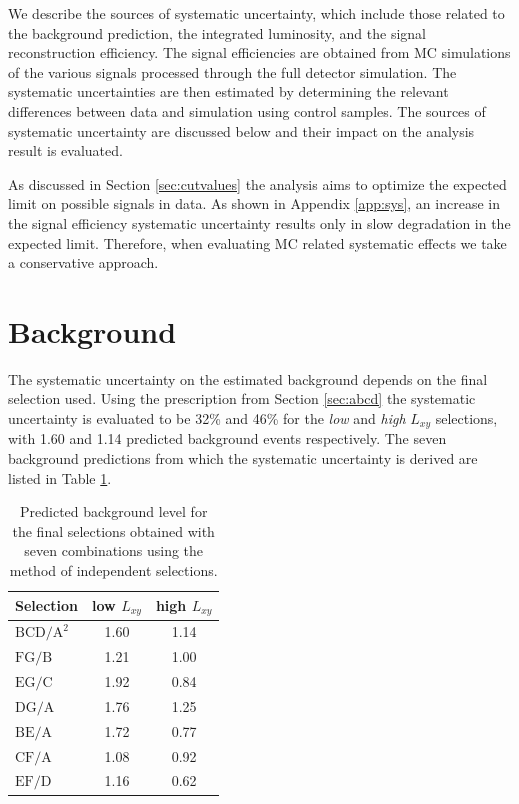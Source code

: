 We describe the sources of systematic uncertainty, which include those related to 
the background prediction, the integrated luminosity, and the signal reconstruction efficiency. 
The signal efficiencies are obtained from MC simulations of the various signals processed
through the full detector simulation. 
The systematic uncertainties are then estimated by determining
the relevant differences between data and simulation using control samples. The sources
of systematic uncertainty are discussed below and their impact on the analysis result is
evaluated.
 
As discussed in Section \ref{sec:cutvalues} the analysis aims to optimize the expected limit
on possible signals in data.
As shown in Appendix \ref{app:sys}, an increase in the signal efficiency systematic uncertainty results only in slow degradation in the expected limit.
Therefore, when evaluating MC related systematic effects we take a conservative approach.



\section{Background}
The systematic uncertainty on the estimated background depends on the final selection used.
Using the prescription from Section \ref{sec:abcd} the systematic uncertainty 
is evaluated to be 32\% and 46\%
for the {\it low} and {\it high} $L_{xy}$ selections, with 1.60 and 1.14 predicted background events respectively. 
The seven background predictions from which the systematic uncertainty is derived are listed in Table \ref{tab:sigbkg}.

\begin{table}[htbp]
\centering
\caption{Predicted background level for the final selections obtained with seven combinations using the
method of independent selections. \label{tab:sigbkg}}
\vspace{0.1cm}
\begin{tabular}{lcc}

\hline
Selection & low $L_{xy} $& high $L_{xy}$ \\
\hline
$\text{BCD/}\text{A}^2$ & 1.60 & 1.14 \\
$\text{FG/B}$ & 1.21 & 1.00 \\
$\text{EG/C}$ & 1.92 & 0.84 \\
$\text{DG/A}$ & 1.76 & 1.25 \\
$\text{BE/A}$ & 1.72 & 0.77 \\
$\text{CF/A}$ & 1.08 & 0.92 \\
$\text{EF/D}$ & 1.16 & 0.62 \\
\hline

\end{tabular}
\end{table} 


